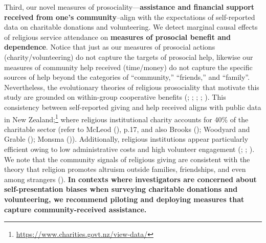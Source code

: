 \documentclass[
  single column]{article}
\begin{document}
Third, our novel measures of prosociality---\textbf{assistance and
financial support received from one's community}--align with the
expectations of self-reported data on charitable donations and
volunteering. We detect marginal causal effects of religious service
attendance on \textbf{measures of prosocial benefit and dependence}.
Notice that just as our measures of prosocial actions
(charity/volunteering) do not capture the targets of prosocial help,
likewise our measures of community help received (time/money) do not
capture the specific sources of help beyond the categories of
``community,'' ``friends,'' and ``family''. Nevertheless, the
evolutionary theories of religious prosociality that motivate this study
are grounded on within-group cooperative benefits
(;
;
;
;
). This
consistency between self-reported giving and help received aligns with
public data in New Zealand;\footnote{\url{https://www.charities.govt.nz/view-data/}}
where religious institutional charity accounts for 40\% of the
charitable sector (refer to McLeod (),
p.17, and also Brooks (); Woodyard
and Grable (); Monsma
()). Additionally, religious
institutions appear particularly efficient owing to low administrative
costs and high volunteer engagement
(;
;
). We note that the
community signals of religious giving are consistent with the theory
that religion promotes altruism outside families, friendships, and even
among strangers (). \textbf{In contexts where investigators are concerned about
self-presentation biases when surveying charitable donations and
volunteering, we recommend piloting and deploying measures that capture
community-received assistance.}
\end{document}
